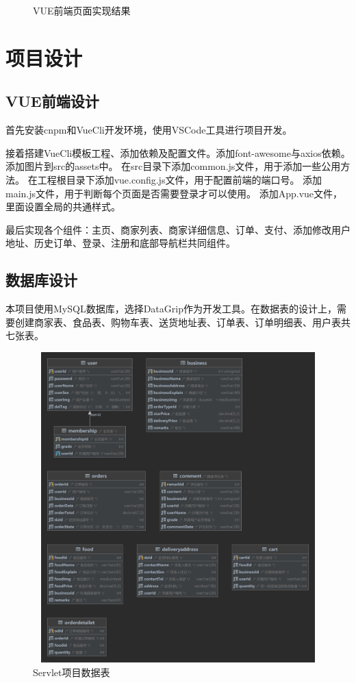 \begin{figure}[H]
{\begin{minipage}[t]{0.22\linewidth}
        \end{minipage}
    }
    \centering
    \caption{VUE前端页面实现结果}
\end{figure}

\section{项目设计}

\subsection{VUE前端设计}
首先安装cnpm和VueCli开发环境，使用VSCode工具进行项目开发。

接着搭建VueCli模板工程、添加依赖及配置文件。添加font-awesome与axios依赖。
添加图片到src的assets中。
在src目录下添加common.js文件，用于添加一些公用方法。
在工程根目录下添加vue.config.js文件，用于配置前端的端口号。
添加main.js文件，用于判断每个页面是否需要登录才可以使用。
添加App.vue文件，里面设置全局的共通样式。

最后实现各个组件：主页、商家列表、商家详细信息、订单、支付、添加修改用户地址、历史订单、登录、注册和底部导航栏共同组件。

\subsection{数据库设计}
本项目使用MySQL数据库，选择DataGrip作为开发工具。在数据表的设计上，需要创建商家表、食品表、购物车表、送货地址表、订单表、订单明细表、用户表共七张表。

\begin{figure}[H]
    \centering
    \includegraphics[width=15cm,height=12cm]{figures/table2.jpg}
    \caption{Servlet项目数据表}
\end{figure}

